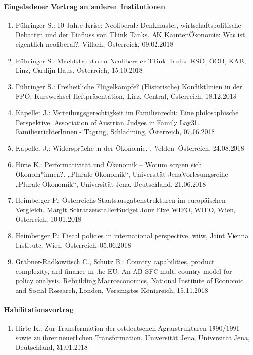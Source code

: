 \paragraph{Eingeladener Vortrag an anderen Institutionen}
\begin{enumerate}
	\item Pühringer S.: 10 Jahre Krise: Neoliberale Denkmuster, wirtschaftspolitische Debatten und der Einfluss von Think Tanks. AK KärntenÖkonomie: Was ist eigentlich neoliberal?, Villach, Österreich, 09.02.2018
	\item Pühringer S.: Machtstrukturen Neoliberaler Think Tanks. KSÖ, ÖGB, KAB, Linz, Cardijn Haus, Österreich, 15.10.2018
	\item Pühringer S.: Freiheitliche Flügelkämpfe? (Historische) Konfliktlinien in der FPÖ. Kurswechsel-Heftpräsentation, Linz, Central, Österreich, 18.12.2018
	\item Kapeller J.: Verteilungsgerechtigkeit im Familienrecht: Eine philosophische Perspektive. Association of Austrian Judges in Family Lay31. FamilienrichterInnen - Tagung, Schladming, Österreich, 07.06.2018
	\item Kapeller J.: Widersprüche in der Ökonomie. , Velden, Österreich, 24.08.2018
	\item Hirte K.: Performativität und Ökonomik – Worum sorgen sich Ökonom*innen?. „Plurale Ökonomik“, Universität JenaVorlesungsreihe „Plurale Ökonomik“, Universität Jena, Deutschland, 21.06.2018
	\item Heimberger P.: Österreichs Staatsausgabenstrukturen im europäischen Vergleich. Margit SchratzenstallerBudget Jour Fixe WIFO, WIFO, Wien, Österreich, 10.01.2018
	\item Heimberger P.: Fiscal policies in international perspective. wiiw, Joint Vienna Institute, Wien, Österreich, 05.06.2018
	\item Gräbner-Radkowitsch C., Schütz B.: Country capabilities, product complexity, and finance in the EU:  An AB-SFC multi country model for policy analysis. Rebuilding Macroeconomics, National Institute of Economic and Social Research, London, Vereinigtes Königreich, 15.11.2018
\end{enumerate}
\paragraph{Habilitationsvortrag}
\begin{enumerate}
	\item Hirte K.: Zur Transformation der ostdeutschen Agrarstrukturen 1990/1991 sowie zu ihrer neuerlichen Transformation. Universität Jena, Universität Jena, Deutschland, 31.01.2018
\end{enumerate}
